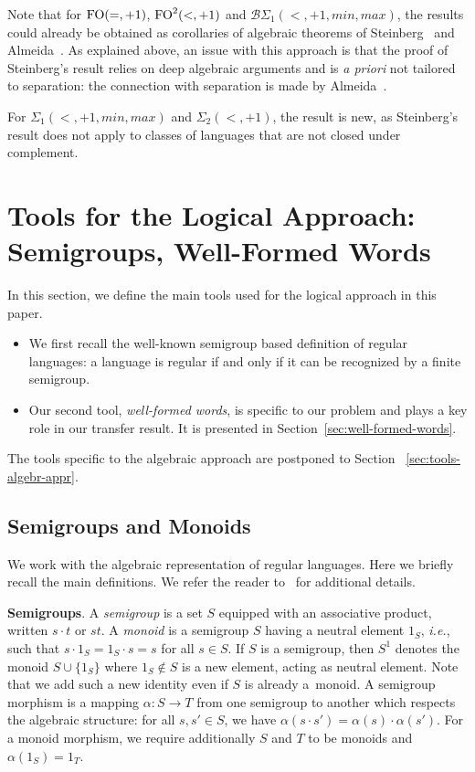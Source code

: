 \documentclass[a4paper,USenglish]{lipics}
\newcommand{\plus}{\ensuremath{+1,min,max}}
\newcommand{\sip}[1]{\ensuremath{\Sigma_{#1}(<,\plus)}\xspace}
\newcommand{\bsp}[1]{\ensuremath{\mathcal{B}\Sigma_{#1}(<,\plus)}\xspace}
\newcommand{\sdp}{\ensuremath{\Sigma_{2}(<,+1)}\xspace}
\newcommand{\foeqp}{\ensuremath{\textup{FO}(=,+1)}\xspace}
\newcommand{\fodp}{\ensuremath{\textup{FO}^2(<,+1)}\xspace}
\newcommand\highlight[1]{\par\bigskip\noindent\textbf{\sffamily #1}.}
\theoremstyle{plain}
\begin{document}
Note that for \foeqp, \fodp and $\bsp 1$, the results could already be
obtained as corollaries of algebraic theorems of
Steinberg~\cite{Steinberg:delay-pointlikes:2001} and
Almeida~\cite{MR1709911}. As explained above, an issue with this approach is
that the proof of Steinberg's result relies on deep algebraic arguments and is
\emph{a priori} not tailored to separation: the connection with separation is
made by Almeida~\cite{MR1709911}.

For {\sip 1} and \sdp, the result is new, as Steinberg's result does not apply
to classes of languages that are not closed under complement. 

\section{Tools for the Logical Approach: Semigroups, Well-Formed Words}
\label{sec:wfwords}
In this section, we define the main tools used for the logical approach in
this paper. 
\begin{itemize}
\item We first recall the well-known semigroup based definition of regular
  languages: a language is regular if and only if it can be recognized by a
  finite semigroup. 

\item Our second tool, \emph{well-formed words}, is specific to our problem and
  plays a key role in our transfer result. It is presented in Section~\ref{sec:well-formed-words}.
\end{itemize}
The tools specific to the algebraic approach are postponed to Section~
\ref{sec:tools-algebr-appr}.

\subsection{Semigroups and Monoids}
\label{sec:semigroups-morphisms}

We work with the algebraic representation of regular languages. Here we
briefly recall the main definitions. We refer the reader to~\cite{Pin15:MPRI}
for additional details.

\highlight{Semigroups}
A \emph{semigroup} is a set $S$ equipped
with an associative product, written $s \cdot t$ or $st$. A \emph{monoid} is a
semigroup $S$ having a neutral element $1_S$, \emph{i.e.}, such that
$s \cdot 1_S = 1_S \cdot s = s$ for all $s \in S$. If $S$ is a semigroup,
then $S^1$ denotes the monoid $S \cup \{1_S\}$ where $1_S \notin S$ is a new
element, acting as neutral element. Note that we add such a new identity even
if $S$ is already a~monoid. A semigroup morphism is a mapping $\alpha:S\to T$
from one semigroup to another which respects the algebraic structure: for all
$s,s'\in S$, we have $\alpha(s\cdot s')=\alpha(s)\cdot\alpha(s')$.
For a monoid morphism, we require additionally $S$ and $T$ to be monoids and $\alpha(1_S)=1_T$.
\end{document}
